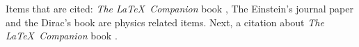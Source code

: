 Items that are cited: \textit{The \LaTeX\ Companion} book \cite{latexcompanion}, The Einstein's journal paper \cite{einstein} and the Dirac's book \cite{dirac} are physics related items. Next, a citation about \textit{The \LaTeX\ Companion} book \cite{latexcompanion}.
